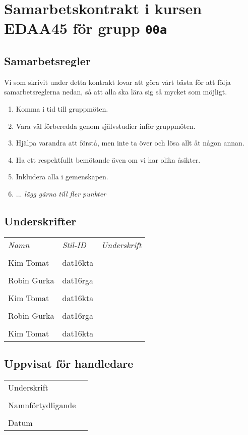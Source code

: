 \documentclass[12pt]{article}
\begin{document}
\clearpage\thispagestyle{empty}

\section*{Samarbetskontrakt i kursen EDAA45 för grupp \texttt{00a}}
\subsection*{Samarbetsregler}
Vi som skrivit under detta kontrakt lovar att göra vårt bästa för att följa samarbetsreglerna nedan, så att alla ska lära sig så mycket som möjligt. 
\begin{enumerate}
\item Komma i tid till gruppmöten.
\item Vara väl förberedda genom självstudier inför gruppmöten.
\item Hjälpa varandra att förstå, men inte ta över och lösa allt åt någon annan.
\item Ha ett respektfullt bemötande även om vi har olika åsikter.
\item Inkludera alla i gemenskapen.
\item ... \emph{lägg gärna till fler punkter}
\end{enumerate}

\subsection*{Underskrifter}
\vspace{1em}

\begin{tabular}{l l p{7cm}}
\emph{Namn} & \emph{Stil-ID} & \emph{Underskrift} \\
\\ Kim Tomat & dat16kta & \dotfill \\
\\ Robin Gurka & dat16rga & \dotfill \\
\\ Kim Tomat & dat16kta & \dotfill \\
\\ Robin Gurka & dat16rga & \dotfill \\
\\ Kim Tomat & dat16kta & \dotfill \\
\end{tabular}

\vspace{1em }
\subsection*{Uppvisat för handledare}

\begin{tabular}{l p{8cm}}
\\ Underskrift &  \dotfill \\
\\ Namnförtydligande &  \dotfill \\
\\ Datum & \dotfill \\
\end{tabular}
\end{document}
